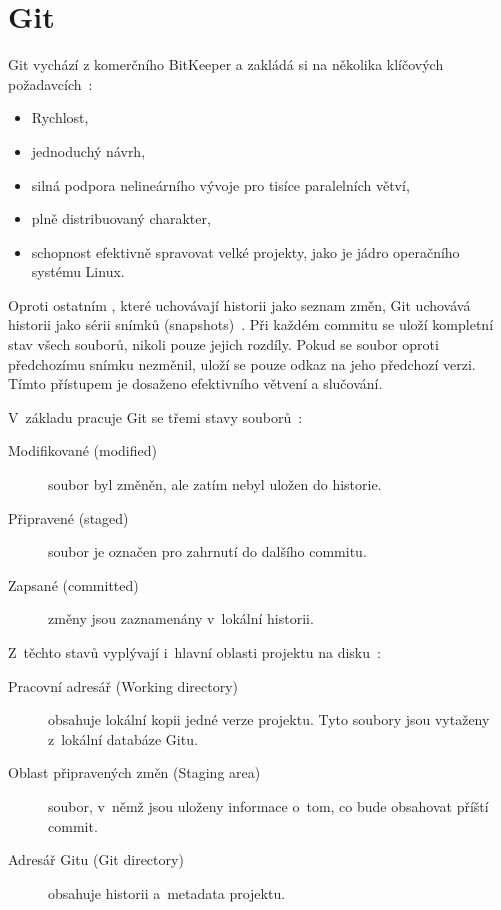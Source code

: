 
\section{Git}
\label{sec:git}
Git vychází z komerčního \VCS BitKeeper a zakládá si na několika klíčových požadavcích~\cite{chacon2014progit}:
\begin{itemize}
  \item Rychlost,
  \item jednoduchý návrh,
  \item silná podpora nelineárního vývoje pro tisíce paralelních větví,
  \item plně distribuovaný charakter,
  \item schopnost efektivně spravovat velké projekty, jako je jádro operačního systému Linux.
\end{itemize}

Oproti ostatním \VCS, které uchovávají historii jako seznam změn, Git uchovává historii jako sérii snímků (snapshots)~\cite{chacon2014progit}. Při každém commitu se uloží kompletní stav všech souborů, nikoli pouze jejich rozdíly. Pokud se soubor oproti předchozímu snímku nezměnil, uloží se pouze odkaz na jeho předchozí verzi. Tímto přístupem je dosaženo efektivního větvení a slučování.

V~základu pracuje Git se třemi stavy souborů~\cite{chacon2014progit}:
\begin{description}
  \item [Modifikované (modified)] soubor byl změněn, ale zatím nebyl uložen do historie.
  \item [Připravené (staged)] soubor je označen pro zahrnutí do dalšího commitu.
  \item [Zapsané (committed)] změny jsou zaznamenány v~lokální historii.
\end{description}

Z~těchto stavů vyplývají i~hlavní oblasti projektu na disku~\cite{chacon2014progit}:
\begin{description}
  \item [Pracovní adresář (Working directory)] obsahuje lokální kopii jedné verze projektu. Tyto soubory jsou vytaženy z~lokální databáze Gitu.
  \item [Oblast připravených změn (Staging area)] soubor, v~němž jsou uloženy informace o~tom, co bude obsahovat příští commit.
  \item [Adresář Gitu (Git directory)] obsahuje historii a~metadata projektu.
\end{description}

